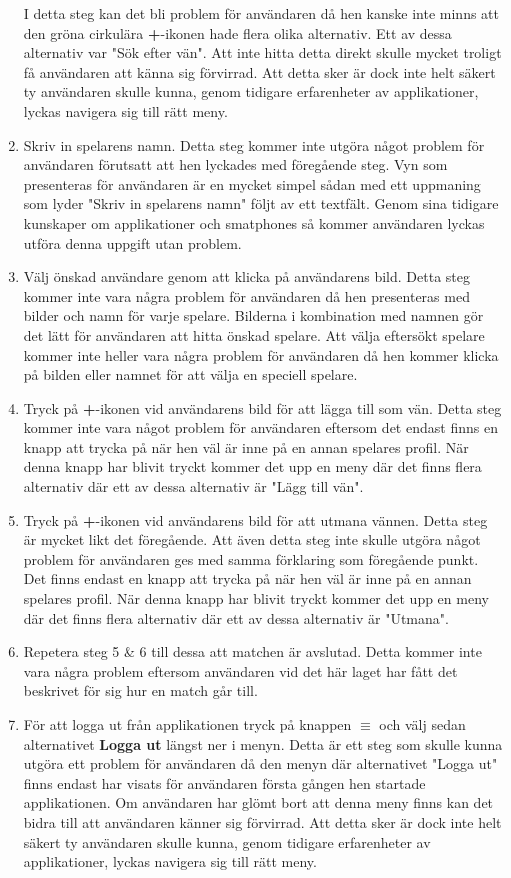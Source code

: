 \documentclass[a4paper, 11pt]{article}
\begin{document}
\begin{enumerate}
I detta steg kan det bli problem för användaren då hen kanske inte minns att den gröna cirkulära \textbf{+}-ikonen hade flera olika alternativ. Ett av dessa alternativ var "Sök efter vän". Att inte hitta detta direkt skulle mycket troligt få användaren att känna sig förvirrad. Att detta sker är dock inte helt säkert ty användaren skulle kunna, genom tidigare erfarenheter av applikationer, lyckas navigera sig till rätt meny.
\item Skriv in spelarens namn.
Detta steg kommer inte utgöra något problem för användaren förutsatt att hen lyckades med föregående steg. Vyn som presenteras för användaren är en mycket simpel sådan med ett uppmaning som lyder "Skriv in spelarens namn" följt av ett textfält. Genom sina tidigare kunskaper om applikationer och smatphones så kommer användaren lyckas utföra denna uppgift utan problem.
\item Välj önskad användare genom att klicka på användarens bild.
Detta steg kommer inte vara några problem för användaren då hen presenteras med bilder och namn för varje spelare. Bilderna i kombination med namnen gör det lätt för användaren att hitta önskad spelare. Att välja eftersökt spelare kommer inte heller vara några problem för användaren då hen kommer klicka på bilden eller namnet för att välja en speciell spelare.
\item Tryck på \textbf{+}-ikonen vid användarens bild för att lägga till som vän.
Detta steg kommer inte vara något problem för användaren eftersom det endast finns en knapp att trycka på när hen väl är inne på en annan spelares profil. När denna knapp har blivit tryckt kommer det upp en meny där det finns flera alternativ där ett av dessa alternativ är "Lägg till vän". 
\item Tryck på \textbf{+}-ikonen vid användarens bild för att utmana vännen.
Detta steg är mycket likt det föregående. Att även detta steg inte skulle utgöra något problem för användaren ges med samma förklaring som föregående punkt. Det finns endast en knapp att trycka på när hen väl är inne på en annan spelares profil. När denna knapp har blivit tryckt kommer det upp en meny där det finns flera alternativ där ett av dessa alternativ är "Utmana".
\item Repetera steg 5 \& 6 till dessa att matchen är avslutad.
Detta kommer inte vara några problem eftersom användaren vid det här laget har fått det beskrivet för sig hur en match går till.
\item För att logga ut från applikationen tryck på knappen \textbf{$\equiv$} och välj sedan alternativet \textbf{Logga ut} längst ner i menyn. Detta är ett steg som skulle kunna utgöra ett problem för användaren då den menyn där alternativet "Logga ut" finns endast har visats för användaren första gången hen startade applikationen. Om användaren har glömt bort att denna meny finns kan det bidra till att användaren känner sig förvirrad. Att detta sker är dock inte helt säkert ty användaren skulle kunna, genom tidigare erfarenheter av applikationer, lyckas navigera sig till rätt meny.       
\end{enumerate}
 
\end{document}
